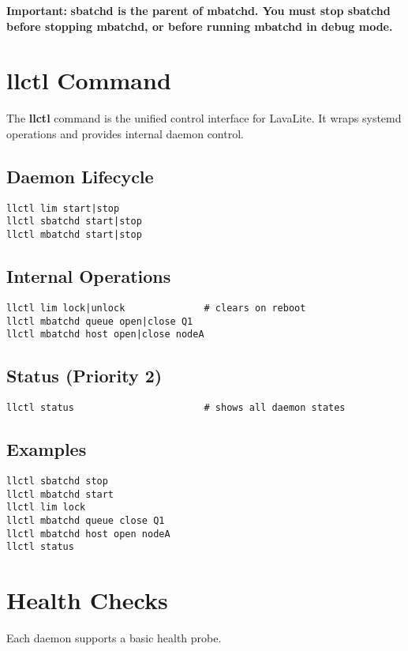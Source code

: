 \documentclass[11pt,a4paper]{article}
\begin{document}
\textbf{Important:} \textbf{sbatchd is the parent of mbatchd. You must stop sbatchd before stopping mbatchd, or before running mbatchd in debug mode.}

\section{\textbf{llctl Command}}
The \textbf{llctl} command is the unified control interface for LavaLite. It wraps systemd operations and provides internal daemon control.

\subsection{\textbf{Daemon Lifecycle}}
\begin{verbatim}
llctl lim start|stop
llctl sbatchd start|stop
llctl mbatchd start|stop
\end{verbatim}

\subsection{\textbf{Internal Operations}}
\begin{verbatim}
llctl lim lock|unlock              # clears on reboot
llctl mbatchd queue open|close Q1
llctl mbatchd host open|close nodeA
\end{verbatim}

\subsection{\textbf{Status (Priority 2)}}
\begin{verbatim}
llctl status                       # shows all daemon states
\end{verbatim}

\subsection{\textbf{Examples}}
\begin{verbatim}
llctl sbatchd stop
llctl mbatchd start
llctl lim lock
llctl mbatchd queue close Q1
llctl mbatchd host open nodeA
llctl status
\end{verbatim}

\section{\textbf{Health Checks}}
Each daemon supports a basic health probe.
\end{document}
